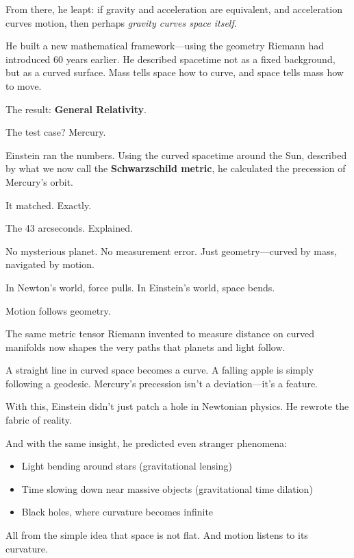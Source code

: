 From there, he leapt: if gravity and acceleration are equivalent, and acceleration curves motion, then perhaps \emph{gravity curves space itself}.

He built a new mathematical framework—using the geometry Riemann had introduced 60 years earlier. He described spacetime not as a fixed background, but as a curved surface. Mass tells space how to curve, and space tells mass how to move.

The result: \textbf{General Relativity}.

The test case? Mercury.

Einstein ran the numbers. Using the curved spacetime around the Sun, described by what we now call the \textbf{Schwarzschild metric}, he calculated the precession of Mercury’s orbit.

It matched. Exactly.

The 43 arcseconds. Explained.

No mysterious planet. No measurement error. Just geometry—curved by mass, navigated by motion.

\begin{tcolorbox}[colback=blue!5!white, colframe=blue!50!black, title={Sidebar: From Dot Products to Deflection}]
In Newton’s world, force pulls.
In Einstein’s world, space bends.

Motion follows geometry.

The same metric tensor Riemann invented to measure distance on curved manifolds now shapes the very paths that planets and light follow.

A straight line in curved space becomes a curve.
A falling apple is simply following a geodesic.
Mercury’s precession isn’t a deviation—it’s a feature.
\end{tcolorbox}

With this, Einstein didn’t just patch a hole in Newtonian physics.
He rewrote the fabric of reality.

And with the same insight, he predicted even stranger phenomena:
\begin{itemize}
  \item Light bending around stars (gravitational lensing)
  \item Time slowing down near massive objects (gravitational time dilation)
  \item Black holes, where curvature becomes infinite
\end{itemize}

All from the simple idea that space is not flat. And motion listens to its curvature.

